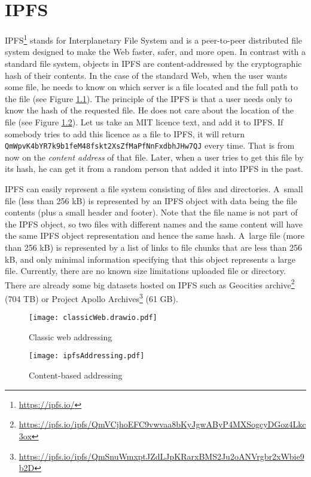 \chapter{IPFS}
\label{ipfs}

IPFS\footnote{\url{https://ipfs.io/}} stands for Interplanetary File System and is a peer-to-peer distributed file system designed to make the Web faster, safer, and more open. In contrast with a standard file system, objects in IPFS are content-addressed by the cryptographic hash of their contents. In the case of the standard Web, when the user wants some file, he needs to know on which server is a file located and the full path to the file (see Figure \ref{webAddressing}). The principle of the IPFS is that a user needs only to know the hash of the requested file. He does not care about the location of the file (see Figure \ref{ipfsAddressing}). Let us take an MIT licence text, and add it to IPFS. If somebody tries to add this licence as a file to IPFS, it will return \texttt{QmWpvK4bYR7k9b1feM48fsk\-t2XsZfMaPfNnFxdbhJHw7QJ} every time. That is from now on the \textit{content address} of that file. Later, when a user tries to get this file by its hash, he can get it from a random person that added it into IPFS in the past.

IPFS can easily represent a file system consisting of files and directories. A~small file (less than 256 kB) is represented by an IPFS object with data being the file contents (plus a small header and footer). Note that the file name is not part of the IPFS object, so two files with different names and the same content will have the same IPFS object representation and hence the same hash. A~large file (more than 256 kB) is represented by a list of links to file chunks that are less than 256 kB, and only minimal information specifying that this object represents a large file. Currently, there are no known size limitations uploaded file or directory. There are already some big datasets hosted on IPFS such as Geocities archive\footnote{\url{https://ipfs.io/ipfs/QmVCjhoEFC9vwvaa8bKyJgwAByP4MXSogcyDGoz4Lkc3ox}} (704 TB) or Project Apollo Archives\footnote{\url{https://ipfs.io/ipfs/QmSnuWmxptJZdLJpKRarxBMS2Ju2oANVrgbr2xWbie9b2D}} (61 GB).


\begin{figure}[h]
    \centering
    \texttt{[image: classicWeb.drawio.pdf]}
    \caption{Classic web addressing}
    \label{webAddressing}
\end{figure}

\begin{figure}[h]
    \centering
    \texttt{[image: ipfsAddressing.pdf]}
    \caption{Content-based addressing}
    \label{ipfsAddressing}
\end{figure}

